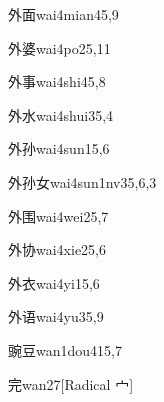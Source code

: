 \begin{verbete}{外面}{wai4mian4}{5,9}
\end{verbete}

\begin{verbete}{外婆}{wai4po2}{5,11}
\end{verbete}

\begin{verbete}{外事}{wai4shi4}{5,8}
\end{verbete}

\begin{verbete}{外水}{wai4shui3}{5,4}
\end{verbete}

\begin{verbete}{外孙}{wai4sun1}{5,6}
\end{verbete}

\begin{verbete}{外孙女}{wai4sun1nv3}{5,6,3}
\end{verbete}

\begin{verbete}{外围}{wai4wei2}{5,7}
\end{verbete}

\begin{verbete}{外协}{wai4xie2}{5,6}
\end{verbete}

\begin{verbete}{外衣}{wai4yi1}{5,6}
\end{verbete}

\begin{verbete}{外语}{wai4yu3}{5,9}
\end{verbete}

\begin{verbete}{豌豆}{wan1dou4}{15,7}
\end{verbete}

\begin{verbete}{完}{wan2}{7}[Radical 宀]
\end{verbete}

